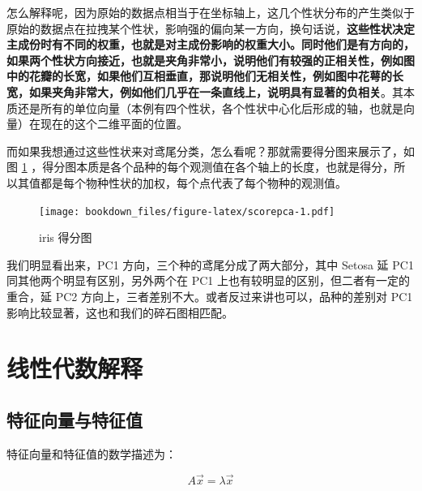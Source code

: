 \documentclass[
]{krantz}
\makeatletter
\newenvironment{Shaded}{\begin{snugshade}}{\end{snugshade}}
\newcommand{\DataTypeTok}[1]{\textcolor[rgb]{0.13,0.29,0.53}{#1}}
\newcommand{\KeywordTok}[1]{\textcolor[rgb]{0.13,0.29,0.53}{\textbf{#1}}}
\newcommand{\NormalTok}[1]{#1}
\newcommand{\OperatorTok}[1]{\textcolor[rgb]{0.81,0.36,0.00}{\textbf{#1}}}
\newcommand{\OtherTok}[1]{\textcolor[rgb]{0.56,0.35,0.01}{#1}}
\newenvironment{kframe}{%
\medskip{}
\setlength{\fboxsep}{.8em}
 \def\at@end@of@kframe{}%
 \ifinner\ifhmode%
  \def\at@end@of@kframe{\end{minipage}}%
  \begin{minipage}{\columnwidth}%
 \fi\fi%
 \def\FrameCommand##1{\hskip\@totalleftmargin \hskip-\fboxsep
 \colorbox{shadecolor}{##1}\hskip-\fboxsep
     \hskip-\linewidth \hskip-\@totalleftmargin \hskip\columnwidth}%
 \MakeFramed {\advance\hsize-\width
   \@totalleftmargin\z@ \linewidth\hsize
   \@setminipage}}%
 {\par\unskip\endMakeFramed%
 \at@end@of@kframe}
\renewenvironment{Shaded}{\begin{kframe}}{\end{kframe}}
\makeatother
\begin{document}
怎么解释呢，因为原始的数据点相当于在坐标轴上，这几个性状分布的产生类似于原始的数据点在拉拽某个性状，影响强的偏向某一方向，换句话说，\textbf{这些性状决定主成份时有不同的权重，也就是对主成份影响的权重大小。同时他们是有方向的，如果两个性状方向接近，也就是夹角非常小，说明他们有较强的正相关性，例如图中的花瓣的长宽，如果他们互相垂直，那说明他们无相关性，例如图中花萼的长宽，如果夹角非常大，例如他们几乎在一条直线上，说明具有显著的负相关}。其本质还是所有的单位向量（本例有四个性状，各个性状中心化后形成的轴，也就是向量）在现在的这个二维平面的位置。

而如果我想通过这些性状来对鸢尾分类，怎么看呢？那就需要得分图来展示了，如图 \ref{fig:scorepca} ，得分图本质是各个品种的每个观测值在各个轴上的长度，也就是得分，所以其值都是每个物种性状的加权，每个点代表了每个物种的观测值。

\begin{Shaded}
\end{Shaded}

\begin{figure}
\centering
\texttt{[image: bookdown\_files/figure-latex/scorepca-1.pdf]}
\caption{\label{fig:scorepca}iris 得分图}
\end{figure}

我们明显看出来，PC1 方向，三个种的鸢尾分成了两大部分，其中 Setosa 延 PC1 同其他两个明显有区别，另外两个在 PC1 上也有较明显的区别，但二者有一定的重合，延 PC2 方向上，三者差别不大。或者反过来讲也可以，品种的差别对 PC1 影响比较显著，这也和我们的碎石图相匹配。

\hypertarget{alge-pca}{%
\section{线性代数解释}\label{alge-pca}}

\hypertarget{egi-pca}{%
\subsection{特征向量与特征值}\label{egi-pca}}

特征向量和特征值的数学描述为：

\begin{equation}
A \vec{x} = \lambda \vec{x}
\label{eq:eign}
\end{equation}
\end{document}
